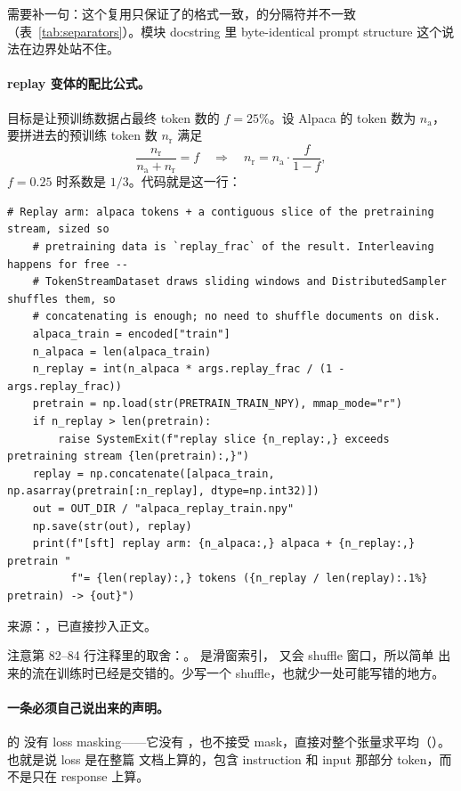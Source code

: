 需要补一句：这个复用只保证了的格式一致，的分隔符并不一致（表~\ref{tab:separators}）。模块 docstring 里 byte-identical prompt structure 这个说法在边界处站不住。

\paragraph{replay 变体的配比公式。}目标是让预训练数据占最终 token 数的 $f=25\%$。设 Alpaca 的 token 数为 $n_{\mathrm{a}}$，要拼进去的预训练 token 数 $n_{\mathrm{r}}$ 满足
\[
\frac{n_{\mathrm{r}}}{n_{\mathrm{a}} + n_{\mathrm{r}}} = f
\quad\Longrightarrow\quad
n_{\mathrm{r}} = n_{\mathrm{a}}\cdot\frac{f}{1-f} ,
\]
$f=0.25$ 时系数是 $1/3$。代码就是这一行：

\begin{lstlisting}[style=hlnum, firstnumber=81]
    # Replay arm: alpaca tokens + a contiguous slice of the pretraining stream, sized so
    # pretraining data is `replay_frac` of the result. Interleaving happens for free --
    # TokenStreamDataset draws sliding windows and DistributedSampler shuffles them, so
    # concatenating is enough; no need to shuffle documents on disk.
    alpaca_train = encoded["train"]
    n_alpaca = len(alpaca_train)
    n_replay = int(n_alpaca * args.replay_frac / (1 - args.replay_frac))
    pretrain = np.load(str(PRETRAIN_TRAIN_NPY), mmap_mode="r")
    if n_replay > len(pretrain):
        raise SystemExit(f"replay slice {n_replay:,} exceeds pretraining stream {len(pretrain):,}")
    replay = np.concatenate([alpaca_train, np.asarray(pretrain[:n_replay], dtype=np.int32)])
    out = OUT_DIR / "alpaca_replay_train.npy"
    np.save(str(out), replay)
    print(f"[sft] replay arm: {n_alpaca:,} alpaca + {n_replay:,} pretrain "
          f"= {len(replay):,} tokens ({n_replay / len(replay):.1%} pretrain) -> {out}")
\end{lstlisting}
\noindent 来源：，已直接抄入正文。

注意第 82--84 行注释里的取舍：。 是滑窗索引， 又会 shuffle 窗口，所以简单  出来的流在训练时已经是交错的。少写一个 shuffle，也就少一处可能写错的地方。

\paragraph{一条必须自己说出来的声明。} 的  没有 loss masking——它没有 ，也不接受 mask，直接对整个张量求平均（）。也就是说 loss 是在整篇  文档上算的，包含 instruction 和 input 那部分 token，而不是只在 response 上算。

